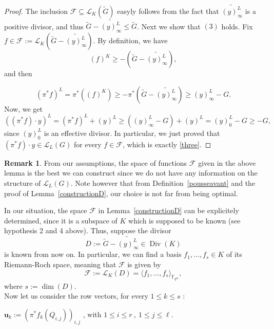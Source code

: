 \documentclass[10pt]{article}
\theoremstyle{definition}
\newtheorem{rq1}[thm]{Remark}
\theoremstyle{definition}
\theoremstyle{definition}
\newcommand{\cd}{\cdot}
\newcommand{\Fqm}{\mathbb{F}_{q^m}}
\newcommand{\su}{\subseteq}
\newcommand{\Div}{\operatorname{Div}}
\newcommand{\calL}{\mathcal{L}}
\begin{document}
\begin{proof}
The inclusion $\mathcal{F} \su \calL_K(\tilde{G})$ easyly follows from the fact that $\widetilde{(y)^L_{\infty}}$ is a positive divisor, and thus $\tilde{G}-\widetilde{(y)^L_{\infty}} \leq \tilde{G}$. Next we show that $(3)$ holds. Fix $f \in \mathcal{F} :=  \calL_K\left(\tilde{G}-\widetilde{(y)^L_{\infty}}\right)$. By definition, we have
\[(f)^K \geq -\left(\tilde{G}-\widetilde{(y)^L_{\infty}}\right),\]
and then

\[(\pi^*f)^L = \pi^*((f)^K) \geq -\pi^*\left(\tilde{G}-\widetilde{(y)^L_{\infty}}\right) \geq (y)^L_{\infty} - G.\]
Now, we get 
\[((\pi^*f) \cd y)^L = (\pi^*f)^L  + (y)^L \geq  ((y)^L_{\infty} - G)+(y)^L = (y)^L_0 - G \geq -G,\]
since $(y)^L_0$ is an effective divisor. In particular, we just proved that $(\pi^*f) \cd y \in \calL_L(G)$ for every $f \in \mathcal{F}$, which is exactly \eqref{three}.
\end{proof}

\begin{rq1}  \label{remark5}
From our assumptions, the space of functions $\mathcal{F}$ given in the above lemma is the best we can construct since we do not have any information on the structure of $\calL_L(G)$. Note however that from Definition~\ref{pousseavant} and the proof of Lemma~\ref{constructionD}, our choice is not far from being optimal.  
\end{rq1}

In our situation, the space $\mathcal{F}$ in Lemma~\ref{constructionD} can be explicitely determined, since it is a subspace of $K$ which is supposed to be known (see hypothesis 2 and 4 above). Thus, suppose the divisor 
\begin{equation} \label{four}
D := \tilde{G} - \widetilde{(y)^L_{\infty}} \in \Div(K)
\end{equation}
is known from now on. In particular, we can find a basis $f_1,...,f_s \in K$ of its Riemann-Roch space, meaning that $\mathcal{F}$ is given by
\[\mathcal{F} := \calL_K(D) = \langle f_1,...,f_s \rangle_{\Fqm},\]
where $s := \dim(D)$. \\
Now let us consider the row vectors, for every $1 \leq k \leq s$ :
\begin{center}
$\mathbf{u}_{k}:= \left(\pi^*f_k(Q_{i,j})\right)_{i,j}$ , with $1 \leq i \leq r \ , \ 1 \leq j \leq \ell$.
\end{center}
\end{document}
